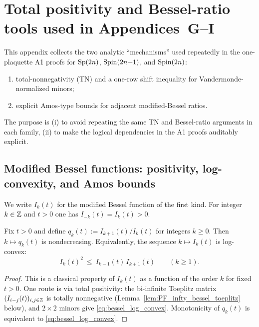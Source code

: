 \section{Total positivity and Bessel-ratio tools used in Appendices~G--I}
\label{app:TP_tools}

This appendix collects the two analytic ``mechanisms'' used repeatedly in the one-plaquette A1 proofs
for $\mathrm{Sp}(2n)$, $\mathrm{Spin}(2n{+}1)$, and $\mathrm{Spin}(2n)$:

\begin{enumerate}[label=(\alph*)]
\item total-nonnegativity (TN) and a one-row shift inequality for Vandermonde-normalized minors;
\item explicit Amos-type bounds for adjacent modified-Bessel ratios.
\end{enumerate}

The purpose is (i) to avoid repeating the same TN and Bessel-ratio arguments in each family,
(ii) to make the logical dependencies in the A1 proofs auditably explicit.

\subsection{Modified Bessel functions: positivity, log-convexity, and Amos bounds}
\label{subsec:TP_tools_bessel}

We write $I_k(t)$ for the modified Bessel function of the first kind.
For integer $k\in\mathbb Z$ and $t>0$ one has $I_{-k}(t)=I_k(t)>0$.

\begin{lemma}
\label{lem:bessel_ratio_monotone}
Fix $t>0$ and define $q_k(t):=I_{k+1}(t)/I_k(t)$ for integers $k\ge 0$.
Then $k\mapsto q_k(t)$ is nondecreasing.
Equivalently, the sequence $k\mapsto I_k(t)$ is log-convex:
\begin{equation}
\label{eq:bessel_log_convex}
I_{k}(t)^2\ \le\ I_{k-1}(t)\,I_{k+1}(t)\qquad(k\ge 1).
\end{equation}
\end{lemma}

\begin{proof}
This is a classical property of $I_k(t)$ as a function of the order $k$ for fixed $t>0$.
One route is via total positivity: the bi-infinite Toeplitz matrix $(I_{i-j}(t))_{i,j\in\mathbb Z}$ is totally nonnegative
(Lemma~\ref{lem:PF_infty_bessel_toeplitz} below), and $2\times 2$ minors give \eqref{eq:bessel_log_convex}.
Monotonicity of $q_k(t)$ is equivalent to \eqref{eq:bessel_log_convex}.
\end{proof}

